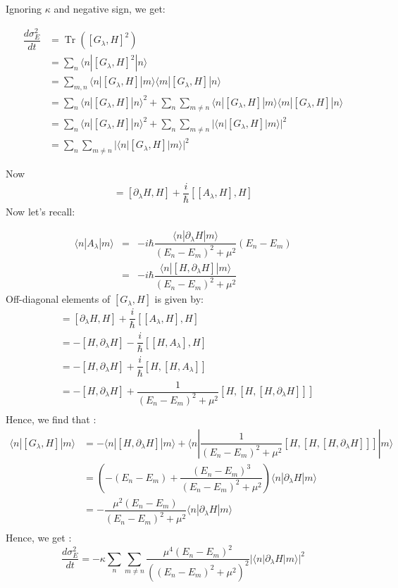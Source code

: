 \documentclass[11pt,a4paper]{article}
\DeclareMathOperator{\Tr}{Tr}
\begin{document}
Ignoring $\kappa$ and negative sign, we get:

\begin{align}
\dfrac{d \sigma^2_E}{dt}&= \Tr ([G_{\lambda}, H]^2)\\
&= \sum_n \langle n |  [G_{\lambda}, H]^2  |    n \rangle  \\
&= \sum_{m,n} \langle n |  [G_{\lambda}, H]|  m \rangle \langle m |  [G_{\lambda}, H]  |    n \rangle \\
&= \sum_{n} \langle n |  [G_{\lambda}, H]|  n \rangle ^2   +  \sum_{ n} \sum_{m \neq n} \langle n |  [G_{\lambda}, H]|  m \rangle \langle m |  [G_{\lambda}, H]  |    n \rangle \\
&= \sum_{n} \langle n |  [G_{\lambda}, H]|  n \rangle ^2   +  \sum_{ n} \sum_{m \neq n} |\langle n |  [G_{\lambda}, H]|  m \rangle |^2 \\
&=  \sum_{ n} \sum_{m \neq n} |\langle n |  [G_{\lambda}, H]|  m \rangle |^2
\end{align}

Now \begin{align*}
 [G_{\lambda}, H]= [\partial_{\lambda} H,H] + \dfrac{i}{\hbar} [[A_{\lambda} , H],H]
\end{align*}
Now let's recall:

\begin{eqnarray}
\langle n | A_{\lambda} | m \rangle &=&  -i \hbar \dfrac{\langle n | \partial_{\lambda}H  | m \rangle}{(E_n-E_m)^2 + \mu^2} (E_n-E_m) \\
&=&  -i \hbar \dfrac{\langle n | [H, \partial_{\lambda} H]  | m \rangle}{(E_n-E_m)^2 + \mu^2} 
\end{eqnarray}
Off-diagonal elements of $[G_{\lambda}, H]$ is given by:
\begin{align}
 [G_{\lambda}, H] &= [\partial_{\lambda} H,H] + \dfrac{i}{\hbar} [[A_{\lambda} , H],H] \\
  &= -[H,\partial_{\lambda} H] - \dfrac{i}{\hbar} [[H,A_{\lambda}],H] \\
    &= -[H,\partial_{\lambda} H] + \dfrac{i}{\hbar} [H,[H,A_{\lambda}]] \\
 &=  -[H,\partial_{\lambda} H] + \dfrac{1}{(E_n-E_m)^2 + \mu^2}  [H,[H, [H, \partial_{\lambda} H]]] \\
 \end{align}
Hence, we find that :
\begin{align*}
\langle n |  [G_{\lambda}, H]|  m \rangle  &=  - \langle n |[H,\partial_{\lambda} H] |m \rangle +\langle n| \dfrac{1}{(E_n-E_m)^2 + \mu^2}  [H,[H, [H, \partial_{\lambda} H]]] | m\rangle \\
 &=  \left(-(E_n- E_m) + \dfrac{(E_n- E_m)^3}{(E_n-E_m)^2 + \mu^2} \right)  \langle n |\partial_{\lambda} H |m \rangle \\
 &=  -\dfrac{\mu^2 (E_n- E_m)}{(E_n-E_m)^2 + \mu^2}  \langle n |\partial_{\lambda} H |m \rangle \\
\end{align*}
Hence, we get :
\begin{equation}
\boxed{
\dfrac{d \sigma^2_E}{dt} =  - \kappa \sum_{ n} \sum_{m \neq n}\dfrac{\mu^4 (E_n- E_m)^2}{((E_n-E_m)^2 + \mu^2)^2}  |\langle n |\partial_{\lambda} H |m \rangle|^2}
\end{equation}
\end{document}
